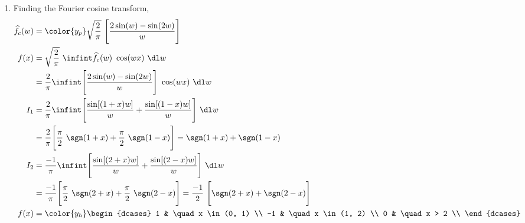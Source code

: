\begin{enumerate}
    \item Finding the Fourier cosine transform,
          \begin{align}
              \widehat{f}_c(w) & = \color{y_p} \sqrt{\frac{2}{\pi}}\ \Bigg[\frac{2\sin(w)
              - \sin(2w)}{w}\Bigg]                                                          \\
              f(x)             & = \sqrt{\frac{2}{\pi}}\ \infint \widehat{f}_c(w)\ \cos(wx)
              \ \dl w                                                                       \\
                               & = \frac{2}{\pi} \infint \Bigg[\frac{2\sin(w) - \sin(2w)}
              {w}\Bigg]\ \cos(wx) \ \dl w                                                   \\
              I_1              & = \frac{2}{\pi} \infint \Bigg[\frac{\sin[(1+x)w]}{w} +
              \frac{\sin[(1-x)w]}{w}\Bigg]\ \dl w                                           \\
                               & = \frac{2}{\pi} \Bigg[ \frac{\pi}{2}\ \sgn(1+x)
                  + \frac{\pi}{2}\ \sgn(1-x) \Bigg]
              = \sgn(1+x) + \sgn(1-x)                                                       \\
              I_2              & = \frac{-1}{\pi} \infint \Bigg[\frac{\sin[(2+x)w]}{w} +
              \frac{\sin[(2-x)w]}{w}\Bigg]\ \dl w                                           \\
                               & = \frac{-1}{\pi} \Bigg[ \frac{\pi}{2}\ \sgn(2+x)
                  + \frac{\pi}{2}\ \sgn(2-x) \Bigg]
              = \frac{-1}{2}\ \Bigg[\sgn(2+x) + \sgn(2-x)\Bigg]                             \\
              f(x)             & = \color{y_h} \begin{dcases}
                                                   1  & \quad x \in (0, 1) \\
                                                   -1 & \quad x \in (1, 2) \\
                                                   0  & \quad x > 2        \\
                                               \end{dcases}
          \end{align}


\end{enumerate}
